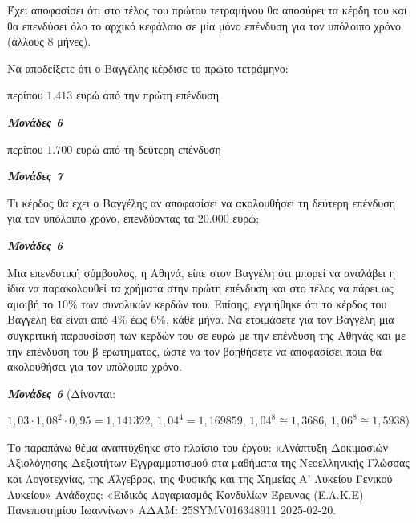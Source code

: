 \documentclass[11pt,a4paper,twoside]{book}
\newcommand{\monades}[1]{
\hspace*{\fill}
\textbf{\textit{\textcolor{maincolor}{Μονάδες #1}}}}
\begin{document}
Έχει αποφασίσει ότι στο τέλος του πρώτου τετραμήνου θα αποσύρει τα κέρδη του και θα επενδύσει όλο το αρχικό κεφάλαιο σε μία μόνο επένδυση για τον υπόλοιπο χρόνο (άλλους $8$ μήνες).

\begin{alist}
\item Να αποδείξετε ότι ο Βαγγέλης κέρδισε το πρώτο τετράμηνο:

\begin{rlist}
\item περίπου $1.413$ ευρώ από την πρώτη επένδυση
\monades{6}
\item περίπου $1.700$ ευρώ από τη δεύτερη επένδυση
\monades{7}
\end{rlist}
\item Τι κέρδος θα έχει ο Βαγγέλης αν αποφασίσει να ακολουθήσει τη δεύτερη επένδυση για τον υπόλοιπο χρόνο, επενδύοντας τα $20.000$ ευρώ;
\monades{6}
\item Μια επενδυτική σύμβουλος, η Αθηνά, είπε στον Βαγγέλη ότι μπορεί να αναλάβει η ίδια να παρακολουθεί τα χρήματα στην πρώτη επένδυση και στο τέλος να πάρει ως αμοιβή το $10$\% των συνολικών κερδών του. Επίσης, εγγυήθηκε ότι το κέρδος του Βαγγέλη θα είναι από $4$\% έως $6$\%, κάθε μήνα. Να ετοιμάσετε για τον Βαγγέλη μια συγκριτική παρουσίαση των κερδών του σε ευρώ με την επένδυση της Αθηνάς και με την επένδυση του β ερωτήματος, ώστε να τον βοηθήσετε να αποφασίσει ποια θα ακολουθήσει για τον υπόλοιπο χρόνο.
\monades{6}
(Δίνονται:

$1,03 \cdot {1,08}^{2} \cdot 0,95 = 1,141322$, ${1,04}^{4} = 1,169859$, ${1,04}^{8} \cong 1,3686$, ${1,06}^{8} \cong 1,5938$)

{\footnotesize Το παραπάνω θέμα αναπτύχθηκε στο πλαίσιο του έργου: «Ανάπτυξη Δοκιμασιών Αξιολόγησης Δεξιοτήτων Εγγραμματισμού στα μαθήματα της Νεοελληνικής Γλώσσας και Λογοτεχνίας, της Άλγεβρας, της Φυσικής και της Χημείας Α' Λυκείου Γενικού Λυκείου» Ανάδοχος: «Ειδικός Λογαριασμός Κονδυλίων Έρευνας (Ε.Λ.Κ.Ε) Πανεπιστημίου Ιωαννίνων» ΑΔΑΜ: 25SYMV016348911 2025-02-20.}
\end{alist}

\vspace{4mm}
\end{document}
